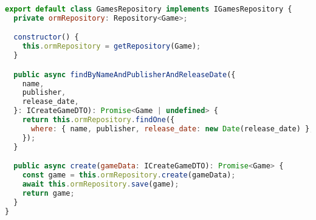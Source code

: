 \begin{lstlisting}[language=JavaScript, caption={O Adaptador de Interface do Banco de Dados},captionpos=b, label=alg:gamerepository]
export default class GamesRepository implements IGamesRepository {
  private ormRepository: Repository<Game>;

  constructor() {
    this.ormRepository = getRepository(Game);
  }

  public async findByNameAndPublisherAndReleaseDate({
    name,
    publisher,
    release_date,
  }: ICreateGameDTO): Promise<Game | undefined> {
    return this.ormRepository.findOne({
      where: { name, publisher, release_date: new Date(release_date) },
    });
  }

  public async create(gameData: ICreateGameDTO): Promise<Game> {
    const game = this.ormRepository.create(gameData);
    await this.ormRepository.save(game);
    return game;
  }
}

\end{lstlisting}